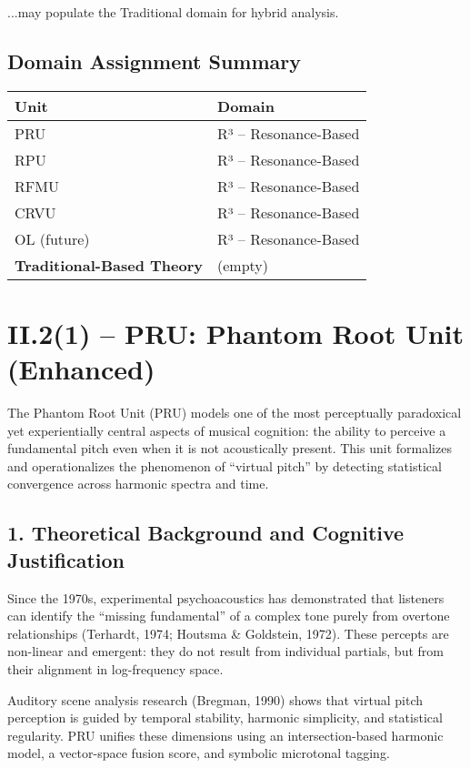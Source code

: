 ...may populate the Traditional domain for hybrid analysis.

\subsection*{Domain Assignment Summary}

\begin{center}
\begin{tabular}{|l|l|}
\hline
\textbf{Unit} & \textbf{Domain} \\
\hline
PRU & R³ – Resonance-Based \\
RPU & R³ – Resonance-Based \\
RFMU & R³ – Resonance-Based \\
CRVU & R³ – Resonance-Based \\
OL (future) & R³ – Resonance-Based \\
\hline
\textbf{Traditional-Based Theory} & (empty) \\
\hline
\end{tabular}
\end{center}

\section*{II.2(1) – PRU: Phantom Root Unit (Enhanced)}

The Phantom Root Unit (PRU) models one of the most perceptually paradoxical yet experientially central aspects of musical cognition: the ability to perceive a fundamental pitch even when it is not acoustically present. This unit formalizes and operationalizes the phenomenon of “virtual pitch” by detecting statistical convergence across harmonic spectra and time.

\subsection*{1. Theoretical Background and Cognitive Justification}

Since the 1970s, experimental psychoacoustics has demonstrated that listeners can identify the “missing fundamental” of a complex tone purely from overtone relationships (Terhardt, 1974; Houtsma \& Goldstein, 1972). These percepts are non-linear and emergent: they do not result from individual partials, but from their alignment in log-frequency space.

Auditory scene analysis research (Bregman, 1990) shows that virtual pitch perception is guided by temporal stability, harmonic simplicity, and statistical regularity. PRU unifies these dimensions using an intersection-based harmonic model, a vector-space fusion score, and symbolic microtonal tagging.

